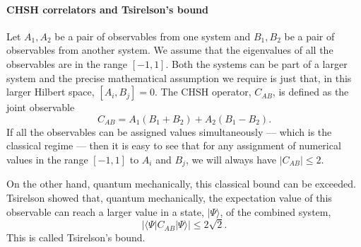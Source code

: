 \documentclass[12pt]{article}
\newcommand{\be}{\begin{equation}}
\newcommand{\ee}{\end{equation}}
\begin{document}
\paragraph{\bf CHSH correlators and Tsirelson's bound \\}

Let $A_1, A_2$ be a pair of observables from one system  and  $B_1, B_2$ be a pair of observables from another system.    We assume that the eigenvalues of all the observables are in the range $[-1, 1]$. Both the systems can be part of a larger system and the precise mathematical assumption we require is just that, in this larger Hilbert space, $[A_i, B_j] = 0$. The CHSH operator, $C_{AB}$, is
defined as the joint observable
\be
\label{cabdefn}
C_{AB} =  A_1 (B_1 + B_2)  +  A_2 (B_1 - B_2).
\ee
If all the observables can be assigned values simultaneously --- which is the classical regime --- then it is easy to see that for any assignment of numerical values in the range $[-1,1]$ to $A_i$ and $B_j$, we will always have $|C_{AB}| \leq 2$.


On the other hand, quantum mechanically, this classical bound can be exceeded. Tsirelson \cite{cirel1980quantum} showed that, quantum mechanically, the expectation value of this observable can reach a larger value  in a state, $|\Psi \rangle$, of the combined system,
\be
|\langle \Psi |  C_{AB}  | \Psi \rangle| \leq 2 \sqrt{2}.
\ee
This is called Tsirelson's bound.
\end{document}
